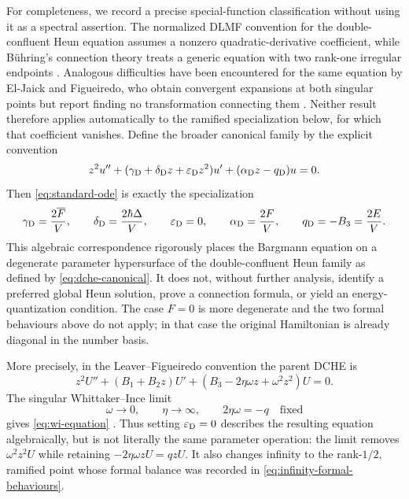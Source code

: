 \documentclass[11pt]{article}
\theoremstyle{remark}
\begin{document}
For completeness, we record a precise special-function classification without
using it as a spectral assertion.  The normalized DLMF convention for the
double-confluent Heun equation assumes a nonzero quadratic-derivative
coefficient, while B\"uhring's connection theory treats a generic equation with
two rank-one irregular endpoints \cite{DLMF31,Buhring1994DCHE}.  Analogous
difficulties have been encountered for the same equation by El-Jaick and
Figueiredo, who obtain convergent expansions at both singular points but
report finding no transformation connecting them
\cite{ElJaickFigueiredo2013Coulomb}.  Neither result therefore applies
automatically to the ramified specialization below, for which that
coefficient vanishes.  Define the broader canonical family by the explicit
convention
\begin{equation}
 z^2u''+(\gamma_{\rm D}+\delta_{\rm D}z+\varepsilon_{\rm D}z^2)u'
 +(\alpha_{\rm D}z-q_{\rm D})u=0.
 \label{eq:dche-canonical}
\end{equation}
Then \eqref{eq:standard-ode} is exactly the specialization
\begin{equation}
 \gamma_{\rm D}=\frac{2\overline F}{V},\qquad
 \delta_{\rm D}=\frac{2\hbar\Delta}{V},\qquad
 \varepsilon_{\rm D}=0,\qquad
 \alpha_{\rm D}=\frac{2F}{V},\qquad
 q_{\rm D}=-B_3=\frac{2E}{V}.
 \label{eq:dche-correspondence}
\end{equation}
This algebraic correspondence rigorously places the Bargmann equation on a
degenerate parameter hypersurface of the double-confluent Heun family as
defined by \eqref{eq:dche-canonical}.  It does not, without further analysis,
identify a preferred global Heun solution, prove a connection formula, or
yield an energy-quantization condition.  The case \(F=0\) is more degenerate
and the two formal behaviours above do not apply; in that case the original
Hamiltonian is already diagonal in the number basis.

More precisely, in the Leaver--Figueiredo convention the parent DCHE is
\begin{equation}
 z^2U''+(B_1+B_2z)U'
 +(B_3-2\eta\omega z+\omega^2z^2)U=0.
 \label{eq:leaver-dche}
\end{equation}
The singular Whittaker--Ince limit
\begin{equation}
 \omega\longrightarrow0,\qquad
 \eta\longrightarrow\infty,\qquad
 2\eta\omega=-q\quad\text{fixed}
 \label{eq:whittaker-ince-limit}
\end{equation}
gives \eqref{eq:wi-equation}
\cite{Figueiredo2005Ince,ElJaickFigueiredo2008Solutions,
ElJaickFigueiredo2013Coulomb}.  Thus setting
\(\varepsilon_{\rm D}=0\) describes the resulting equation algebraically,
but is not literally the same parameter operation: the limit removes
\(\omega^2z^2U\) while retaining \(-2\eta\omega zU=qzU\).  It also changes
infinity to the rank-\(1/2\), ramified point whose formal balance was recorded
in \eqref{eq:infinity-formal-behaviours}.
\end{document}
